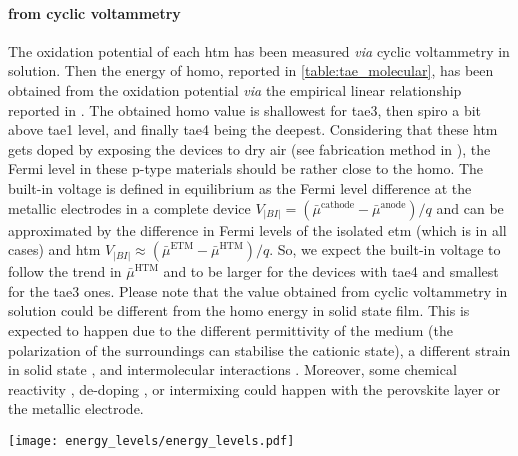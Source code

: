 	\paragraph{ from cyclic voltammetry}
	The oxidation potential of each \gls{htm} has been measured \textsl{via} cyclic voltammetry in solution.
	Then the energy of \gls{homo}, reported in \cref{table:tae_molecular}, has been obtained from the oxidation potential \textsl{via} the empirical linear relationship reported in .
	The obtained \gls{homo} value is shallowest for \gls{tae3}, then \gls{spiro} a bit above \gls{tae1} level, and finally \gls{tae4} being the deepest.
	Considering that these \gls{htm} gets doped by exposing the devices to dry air (see fabrication method in ), the Fermi level in these p-type materials should be rather close to the \gls{homo}.
	The built-in voltage is defined in equilibrium as the Fermi level difference at the metallic electrodes in a complete device $V_|BI| = (\bar\mu^{\mathrm{cathode}} - \bar\mu^{\mathrm{anode}})/q$ and can be approximated by the difference in Fermi levels of the isolated \gls{etm} (which is  in all cases) and \gls{htm} $V_|BI| \approx (\bar\mu^{\mathrm{ETM}} - \bar\mu^{\mathrm{HTM}})/q$.
	So, we expect the built-in voltage to follow the trend in $\bar\mu^{\mathrm{HTM}}$ and to be larger for the devices with \gls{tae4} and smallest for the \gls{tae3} ones.
	Please note that the value obtained from cyclic voltammetry in solution could be different from the \gls{homo} energy in solid state film.
	This is expected to happen due to the different permittivity of the medium (the polarization of the surroundings can stabilise the cationic state), a different strain in solid state \cite{Wei2012a}, and intermolecular interactions \cite{Kashimoto2018}.
	Moreover, some chemical reactivity \cite{Carrillo2016,Kim2016a}, de-doping \cite{Kim2017}, or intermixing \cite{Domanski2016} could happen with the perovskite layer or the metallic electrode.

	\begin{SCfigure}
		\centering
		\texttt{[image: energy\_levels/energy\_levels.pdf]}
		\label{fig:tae-energy_levels}
	\end{SCfigure}

